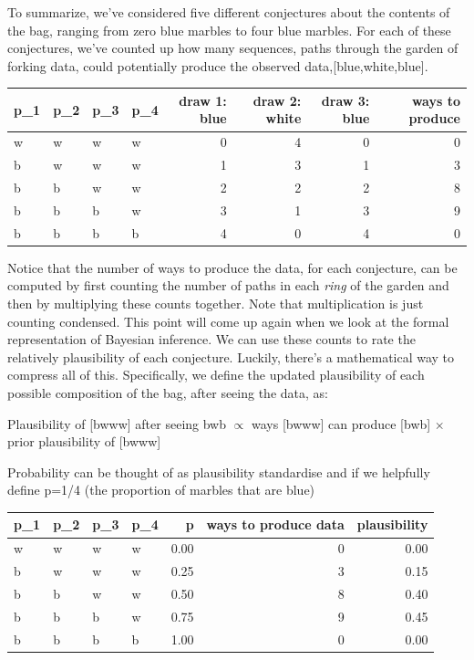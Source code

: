 \documentclass{article}
\begin{document}
To summarize, we've considered five different conjectures about the
contents of the bag, ranging from zero blue marbles to four blue
marbles. For each of these conjectures, we've counted up how many
sequences, paths through the garden of forking data, could potentially
produce the observed data,{[}blue,white,blue{]}.

\begin{table}
\centering
\begin{tabular}{l|l|l|l|r|r|r|r}
\hline
p\_1 & p\_2 & p\_3 & p\_4 & draw 1: blue & draw 2: white & draw 3: blue & ways to produce\\
\hline
w & w & w & w & 0 & 4 & 0 & 0\\
\hline
b & w & w & w & 1 & 3 & 1 & 3\\
\hline
b & b & w & w & 2 & 2 & 2 & 8\\
\hline
b & b & b & w & 3 & 1 & 3 & 9\\
\hline
b & b & b & b & 4 & 0 & 4 & 0\\
\hline
\end{tabular}
\end{table}

Notice that the number of ways to produce the data, for each conjecture,
can be computed by first counting the number of paths in each
\emph{ring} of the garden and then by multiplying these counts together.
Note that multiplication is just counting condensed. This point will
come up again when we look at the formal representation of Bayesian
inference. We can use these counts to rate the relatively plausibility
of each conjecture. Luckily, there's a mathematical way to compress all
of this. Specifically, we define the updated plausibility of each
possible composition of the bag, after seeing the data, as:

Plausibility of {[}bwww{]} after seeing bwb \(\propto\) ways {[}bwww{]}
can produce {[}bwb{]} \(\times\) prior plausibility of {[}bwww{]}

Probability can be thought of as plausibility standardise and if we
helpfully define p=1/4 (the proportion of marbles that are blue)

\begin{table}
\centering
\begin{tabular}{l|l|l|l|r|r|r}
\hline
p\_1 & p\_2 & p\_3 & p\_4 & p & ways to produce data & plausibility\\
\hline
w & w & w & w & 0.00 & 0 & 0.00\\
\hline
b & w & w & w & 0.25 & 3 & 0.15\\
\hline
b & b & w & w & 0.50 & 8 & 0.40\\
\hline
b & b & b & w & 0.75 & 9 & 0.45\\
\hline
b & b & b & b & 1.00 & 0 & 0.00\\
\hline
\end{tabular}
\end{table}
\end{document}
